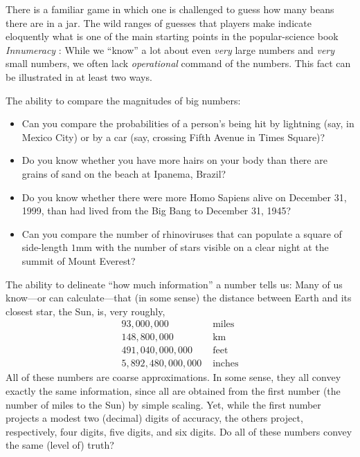There is a familiar game in which one is challenged to guess how many
beans there are in a jar. The wild ranges of guesses that players make
indicate eloquently what is one of the main starting points in the
popular-science book {\it Innumeracy} \cite{Paulos}: While we ``know''
a lot about even {\em very} large numbers and {\em very} small
numbers, we often lack {\em operational} command of the numbers.  This
fact can be illustrated in at least two ways.

The ability to compare the magnitudes of big numbers:
\begin{itemize}
\item
Can you compare the probabilities of a person's being hit by lightning
(say, in Mexico City) or by a car (say, crossing Fifth Avenue in Times
Square)?
\item
Do you know whether you have more hairs on your body than there are
grains of sand on the beach at Ipanema, Brazil?
\item

Do you know whether there were more Homo Sapiens alive on December 31,
1999, than had lived from the Big Bang to December 31, 1945?
\item
Can you compare the number of rhinoviruses that can populate a square
of side-length $1$mm with the number of stars visible on a clear night
at the summit of Mount Everest?
\end{itemize}

The ability to delineate ``how much information'' a number tells us:
Many of us know---or can calculate---that (in some sense) the distance
between Earth and its closest star, the Sun, is, very roughly,
\[ \begin{array}{rl}
93,000,000 & \mbox{ miles} \\
148,800,000 & \mbox{ km} \\
491,040,000,000 & \mbox{ feet} \\
5,892,480,000,000 & \mbox{ inches}
\end{array}
\]
All of these numbers are coarse approximations.  In some sense, they
all convey exactly the same information, since all are obtained from
the first number (the number of miles to the Sun) by simple scaling.
Yet, while the first number projects a modest two (decimal) digits of
accuracy, the others project, respectively, four digits, five digits,
and six digits.  Do all of these numbers convey the same (level of)
truth?

\medskip

